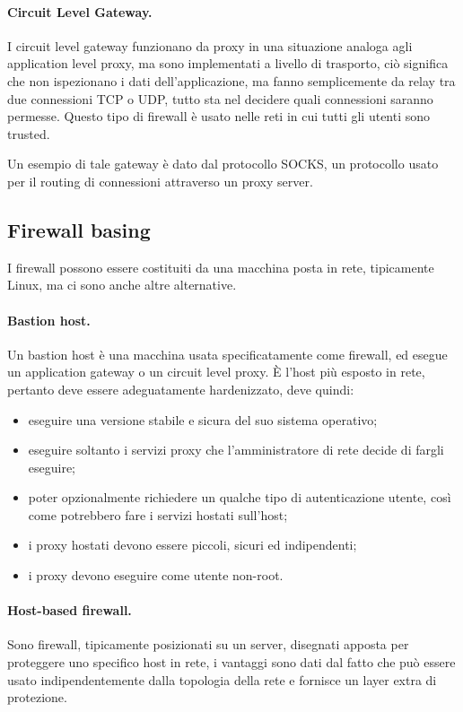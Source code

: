 \documentclass[a4paper, 10pt, twoside]{article}
\begin{document}
	\paragraph{Circuit Level Gateway.} I circuit level gateway funzionano da proxy in una situazione analoga agli application level proxy, ma sono implementati a livello di trasporto, ciò significa che non ispezionano i dati dell'applicazione, ma fanno semplicemente da relay tra due connessioni TCP o UDP, tutto sta nel decidere quali connessioni saranno permesse. Questo tipo di firewall è usato nelle reti in cui tutti gli utenti sono trusted.

	Un esempio di tale gateway è dato dal protocollo SOCKS, un protocollo usato per il routing di connessioni attraverso un proxy server.

	\subsection{Firewall basing}
	I firewall possono essere costituiti da una macchina posta in rete, tipicamente Linux, ma ci sono anche altre alternative.

	\paragraph{Bastion host.} Un bastion host è una macchina usata specificatamente come firewall, ed esegue un application gateway o un circuit level proxy. È l'host più esposto in rete, pertanto deve essere adeguatamente hardenizzato, deve quindi: \begin{itemize}
		\item eseguire una versione stabile e sicura del suo sistema operativo;
		\item eseguire soltanto i servizi proxy che l'amministratore di rete decide di fargli eseguire;
		\item poter opzionalmente richiedere un qualche tipo di autenticazione utente, così come potrebbero fare i servizi hostati sull'host;
		\item i proxy hostati devono essere piccoli, sicuri ed indipendenti;
		\item i proxy devono eseguire come utente non-root.
	\end{itemize}

	\paragraph{Host-based firewall.} Sono firewall, tipicamente posizionati su un server, disegnati apposta per proteggere uno specifico host in rete, i vantaggi sono dati dal fatto che può essere usato indipendentemente dalla topologia della rete e fornisce un layer extra di protezione.
\end{document}
